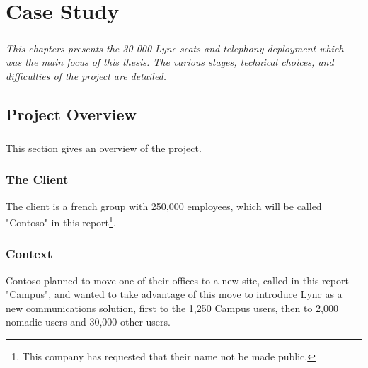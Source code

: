 


\chapter{Case Study}\label{chapter_case}

\paragraph{}
\textit{This chapters presents the 30 000 Lync seats and telephony deployment which was the main focus of this thesis. The various stages, technical choices, and difficulties of the project are detailed.}


\section{Project Overview}
\paragraph{}
This section gives an overview of the project.

\subsection{The Client}
	The client is a french group with 250,000 employees, which will be called "Contoso" in this report\footnote{This company has requested that their name not be made public.}.
	
\subsection{Context}
	Contoso planned to move one of their offices to a new site, called in this report "Campus", and wanted to take advantage of this move to introduce Lync as a new communications solution, first to the 1,250 Campus users, then to 2,000 nomadic users and 30,000 other users.

